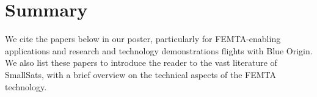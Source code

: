 \documentclass{article}
\begin{document}
\section*{Summary}

We cite the papers below in our poster, particularly for FEMTA-enabling applications and research and technology demonstrations flights with Blue Origin. We also list these papers to introduce the reader to the vast literature of SmallSats, with a brief overview on the technical aspects of the FEMTA technology. 

\nocite{pugia2022characterization}
\nocite{villela2019towards}
\nocite{gasaway2022propellant}
\nocite{llanos2019challenges}
\nocite{yost2022state}
\nocite{lemmer2017propulsion}
\nocite{cappelletti2021cubesat}
\nocite{wagner2021research}
\nocite{alexeenko2021distributed}
\nocite{jaiswal2019femta}
\printbibliography
\end{document}
